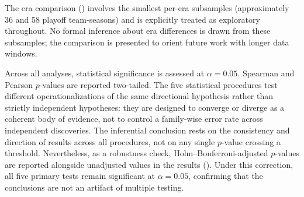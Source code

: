 The era comparison () involves the smallest per-era
subsamples (approximately 36 and 58 playoff team-seasons) and is explicitly
treated as exploratory throughout. No formal inference about era differences
is drawn from these subsamples; the comparison is presented to orient future
work with longer data windows.

Across all analyses, statistical significance is assessed at $\alpha = 0.05$.
Spearman and Pearson $p$-values are reported two-tailed. The five
statistical procedures test different operationalizations of the same
directional hypothesis rather than strictly independent hypotheses: they are
designed to converge or diverge as a coherent body of evidence, not to control a
family-wise error rate across independent discoveries. The inferential
conclusion rests on the consistency and direction of results across all
procedures, not on any single $p$-value crossing a threshold. Nevertheless, as
a robustness check, Holm--Bonferroni-adjusted $p$-values are reported alongside
unadjusted values in the results (). Under this
correction, all five primary tests remain significant at $\alpha = 0.05$,
confirming that the conclusions are not an artifact of multiple testing.
